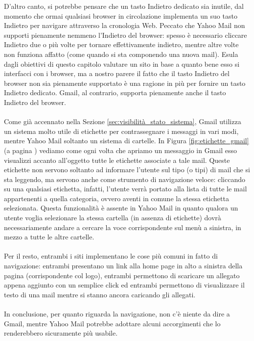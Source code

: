 		D'altro canto, si potrebbe pensare che un tasto Indietro dedicato sia inutile, dal momento che ormai qualsiasi browser in circolazione implementa un suo tasto Indietro per navigare attraverso la cronologia Web. Peccato che Yahoo Mail non supporti pienamente nemmeno l'Indietro del browser: spesso è necessario cliccare Indietro due o più volte per tornare effettivamente indietro, mentre altre volte non funziona affatto (come quando si sta componendo una nuova mail). Esula dagli obiettivi di questo capitolo valutare un sito in base a quanto bene esso si interfacci con i browser, ma a nostro parere il fatto che il tasto Indietro del browser non sia pienamente supportato è una ragione in più per fornire un tasto Indietro dedicato. Gmail, al contrario, supporta pienamente anche il tasto Indietro del browser.\\
		\\
		Come già accennato nella Sezione \ref{sec:visibilità_stato_sistema}, Gmail utilizza un sistema molto utile di etichette per contrassegnare i messaggi in vari modi, mentre Yahoo Mail soltanto un sistema di cartelle. In Figura \ref{fig:etichette_gmail} (a pagina \pageref{fig:etichette_gmail}) vediamo come ogni volta che apriamo un messaggio in Gmail esso visualizzi accanto all'oggetto tutte le etichette associate a tale mail. Queste etichette non servono soltanto ad informare l'utente sul tipo (o tipi) di mail che si sta leggendo, ma servono anche come strumento di navigazione veloce: cliccando su una qualsiasi etichetta, infatti, l'utente verrà portato alla lista di tutte le mail appartenenti a quella categoria, ovvero aventi in comune la stessa etichetta selezionata. Questa funzionalità è assente in Yahoo Mail in quanto qualora un utente voglia selezionare la stessa cartella (in assenza di etichette) dovrà necessariamente andare a cercare la voce corrispondente sul menù a sinistra, in mezzo a tutte le altre cartelle.\\
		\\
		Per il resto, entrambi i siti implementano le cose più comuni in fatto di navigazione: entrambi presentano un link alla home page in alto a sinistra della pagina (corrispondente col logo), entrambi permettono di scaricare un allegato appena aggiunto con un semplice click ed entrambi permettono di visualizzare il testo di una mail mentre si stanno ancora caricando gli allegati.\\
		\\
		In conclusione, per quanto riguarda la navigazione, non c'è niente da dire a Gmail, mentre Yahoo Mail potrebbe adottare alcuni accorgimenti che lo renderebbero sicuramente più usabile.
		
